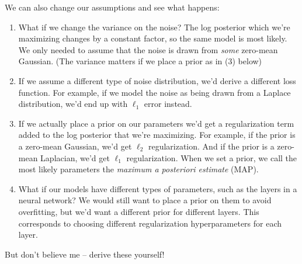 \documentclass{article}
\begin{document}
We can also change our assumptions and see what happens:
\begin{enumerate}
\item What if we change the variance on the noise? The log posterior which we're maximizing changes by a constant factor, so the same model is most likely. We only needed to assume that the noise is drawn from \emph{some} zero-mean Gaussian. (The variance matters if we place a prior as in (3) below) 
\item If we assume a different type of noise distribution, we'd derive a different loss function. For example, if we model the noise as being drawn from a Laplace distribution, we'd end up with $\ell_1$ error instead. 
\item If we actually place a prior on our parameters we'd get a regularization term added to the log posterior that we're maximizing. For example, if the prior is a zero-mean Gaussian, we'd get $\ell_2$ regularization. And if the prior is a zero-mean Laplacian, we'd get $\ell_1$ regularization. When we set a prior, we call the most likely parameters the \emph{maximum a posteriori estimate} (MAP).
\item What if our models have different types of parameters, such as the layers in a neural network? We would still want to place a prior on them to avoid overfitting, but we'd want a different prior for different layers. This corresponds to choosing different regularization hyperparameters for each layer.
\end{enumerate}

But don't believe me -- derive these yourself!
\end{document}
